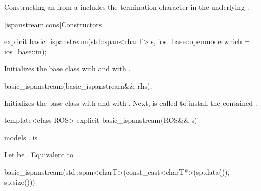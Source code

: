 \pnum
\begin{note}
Constructing an  from a 
includes the termination character 
in the underlying .
\end{note}

[ispanstream.cons]{Constructors}

%
\begin{itemdecl}
explicit basic_ispanstream(std::span<charT> s, ios_base::openmode which = ios_base::in);
\end{itemdecl}

\begin{itemdescr}
\pnum
\effects
Initializes the base class with
and  with
.
\end{itemdescr}

%
\begin{itemdecl}
basic_ispanstream(basic_ispanstream&& rhs);
\end{itemdecl}

\begin{itemdescr}
\pnum
\effects
Initializes the base class with 
and  with .
Next,  is called
to install the contained .
\end{itemdescr}

%
\begin{itemdecl}
template<class ROS> explicit basic_ispanstream(ROS&& s)
\end{itemdecl}

\begin{itemdescr}
\pnum
\constraints
{} models .
is .

\pnum
\effects
Let  be .
Equivalent to
\begin{codeblock}
basic_ispanstream(std::span<charT>(const_cast<charT*>(sp.data()), sp.size()))
\end{codeblock}
\end{itemdescr}

